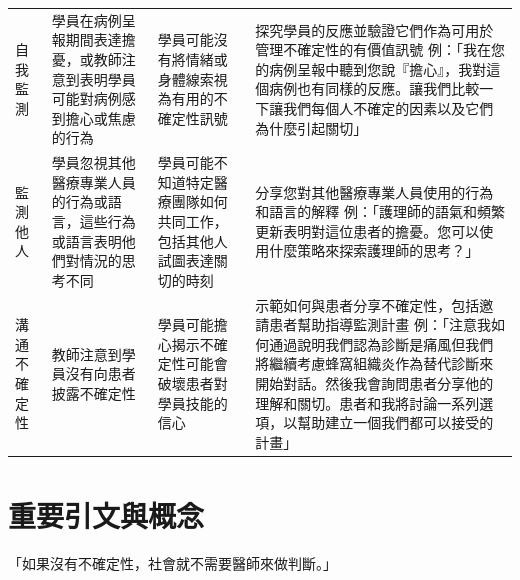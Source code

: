 \documentclass[12pt,a4paper]{article}
\newcommand{\note}[1]{
    \par
    \noindent
    \begin{tcolorbox}[
        colback=emergency_blue!5!white,
        colframe=emergency_blue,
        title=\textbf{重點提醒},
        fonttitle=\bfseries,
        boxrule=0.5pt,
        arc=3pt,
        left=6pt,
        right=6pt,
        top=6pt,
        bottom=6pt
    ]
    #1
    \end{tcolorbox}
}
\begin{document}
\begin{longtable}{>{\raggedright\arraybackslash}p{3cm} >{\raggedright\arraybackslash}p{4cm} >{\raggedright\arraybackslash}p{4cm} >{\raggedright\arraybackslash}p{4cm}}
\textcolor{emergency_blue}{自我監測} & 學員在病例呈報期間表達擔憂，或教師注意到表明學員可能對病例感到擔心或焦慮的行為 & 學員可能沒有將情緒或身體線索視為有用的不確定性訊號 & 探究學員的反應並驗證它們作為可用於管理不確定性的有價值訊號 \newline 例：「我在您的病例呈報中聽到您說『擔心』，我對這個病例也有同樣的反應。讓我們比較一下讓我們每個人不確定的因素以及它們為什麼引起關切」 \\

\textcolor{emergency_blue}{監測他人} & 學員忽視其他醫療專業人員的行為或語言，這些行為或語言表明他們對情況的思考不同 & 學員可能不知道特定醫療團隊如何共同工作，包括其他人試圖表達關切的時刻 & 分享您對其他醫療專業人員使用的行為和語言的解釋 \newline 例：「護理師的語氣和頻繁更新表明對這位患者的擔憂。您可以使用什麼策略來探索護理師的思考？」 \\

\textcolor{emergency_blue}{溝通不確定性} & 教師注意到學員沒有向患者披露不確定性 & 學員可能擔心揭示不確定性可能會破壞患者對學員技能的信心 & 示範如何與患者分享不確定性，包括邀請患者幫助指導監測計畫 \newline 例：「注意我如何通過說明我們認為診斷是痛風但我們將繼續考慮蜂窩組織炎作為替代診斷來開始對話。然後我會詢問患者分享他的理解和關切。患者和我將討論一系列選項，以幫助建立一個我們都可以接受的計畫」 \\
\end{longtable}

\section{重要引文與概念}

\note{「如果沒有不確定性，社會就不需要醫師來做判斷。」}
\end{document}
